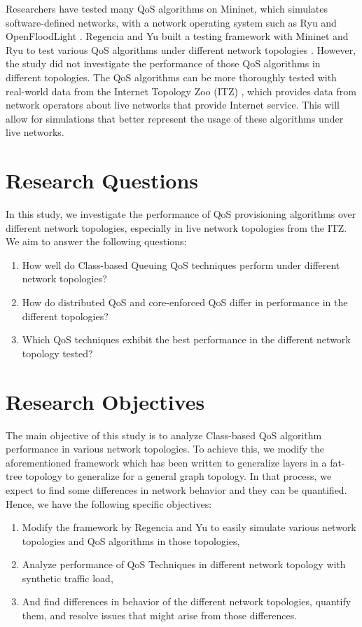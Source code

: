 Researchers have tested many QoS algorithms on Mininet, which simulates software-defined networks, with a network operating system such as Ryu and OpenFloodLight \cite{karakus_quality_2017}. Regencia and Yu built a testing framework with Mininet and Ryu to test various QoS algorithms under different network topologies \cite{yang_introducing_2022}. However, the study did not investigate the performance of those QoS algorithms in different topologies. The QoS algorithms can be more thoroughly tested with real-world data from the Internet Topology Zoo (ITZ) \cite{knight_internet_2011}, which provides data from network operators about live networks that provide Internet service. This will allow for simulations that better represent the usage of these algorithms under live networks.

\section{Research Questions}

In this study, we investigate the performance of QoS provisioning algorithms over different network topologies, especially in live network topologies from the ITZ. We aim to answer the following questions:

\begin{enumerate}
    \item How well do Class-based Queuing QoS techniques perform under different network topologies?
    \item How do distributed QoS and core-enforced QoS differ in performance in the different topologies?
    \item Which QoS techniques exhibit the best performance in the different network topology tested?
\end{enumerate}

\section{Research Objectives}

The main objective of this study is to analyze Class-based QoS algorithm performance in various network topologies. To achieve this, we modify the aforementioned framework which has been written to generalize layers in a fat-tree topology to generalize for a general graph topology. In that process, we expect to find some differences in network behavior and they can be quantified. Hence, we have the following specific objectives:

\begin{enumerate}
    \item Modify the framework by Regencia and Yu to easily simulate various network topologies and QoS algorithms in those topologies,
    \item Analyze performance of QoS Techniques in different network topology with synthetic traffic load,
    \item And find differences in behavior of the different network topologies, quantify them, and resolve issues that might arise from those differences.
\end{enumerate}


